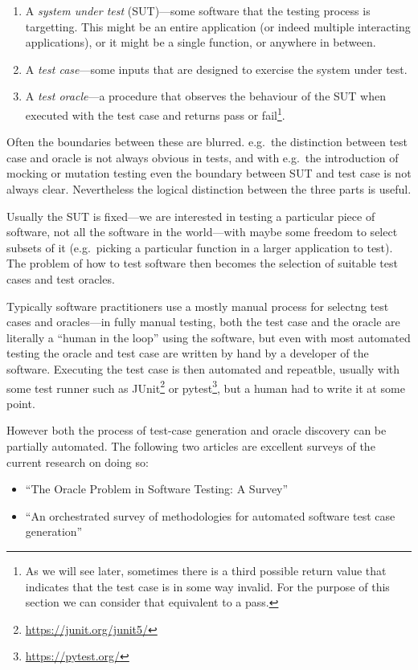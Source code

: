 \begin{enumerate}
\item A \emph{system under test} (SUT)---some software that the testing process is targetting.
This might be an entire application (or indeed multiple interacting applications),
or it might be a single function,
or anywhere in between.
\item A \emph{test case}---some
inputs that are designed to exercise the system under test.
\item A \emph{test oracle}---a
procedure that observes the behaviour of the SUT when executed with the test case and returns pass or fail\footnote{
As we will see later, sometimes there is a third possible return value that indicates that the test case is in some way invalid.
For the purpose of this section we can consider that equivalent to a pass.
}.
\end{enumerate}

Often the boundaries between these are blurred.
e.g.\ the distinction between test case and oracle is not always obvious in tests,
and with e.g.\ the introduction of mocking or mutation testing even the boundary between SUT and test case is not always clear.
Nevertheless the logical distinction between the three parts is useful.

Usually the SUT is fixed---we are interested in testing a particular piece of software,
not all the software in the world---with
maybe some freedom to select subsets of it (e.g.\ picking a particular function in a larger application to test).
The problem of how to test software then becomes the selection of suitable test cases and test oracles.

Typically software practitioners use a mostly manual process for selectng test cases and oracles---in
fully manual testing,
both the test case and the oracle are literally a ``human in the loop'' using the software,
but even with most automated testing the oracle and test case are written by hand by a developer of the software.
Executing the test case is then automated and repeatble, usually with some test runner such as JUnit\footnote{\url{https://junit.org/junit5/}} or pytest\footnote{\url{https://pytest.org/}},
but a human had to write it at some point.

However both the process of test-case generation and oracle discovery can be partially automated.
The following two articles are excellent surveys of the current research on doing so:

\begin{itemize}
\item ``The Oracle Problem in Software Testing: {A} Survey''\cite{DBLP:journals/tse/BarrHMSY15}
\item ``An orchestrated survey of methodologies for automated software test case generation''\cite{DBLP:journals/jss/AnandBCCCGHHMOE13}
\end{itemize}

